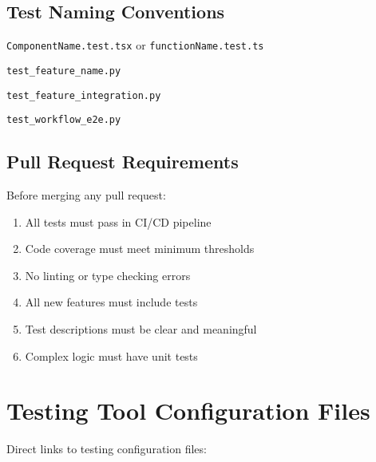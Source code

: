 \documentclass[12pt,a4paper]{article}
\begin{document}
\subsection{Test Naming Conventions}

\begin{description}[style=nextline]
    \item[Frontend] \texttt{ComponentName.test.tsx} or \texttt{functionName.test.ts}
    \item[Backend] \texttt{test\_feature\_name.py}
    \item[Integration] \texttt{test\_feature\_integration.py}
    \item[E2E] \texttt{test\_workflow\_e2e.py}
\end{description}

\subsection{Pull Request Requirements}

Before merging any pull request:
\begin{enumerate}
    \item All tests must pass in CI/CD pipeline
    \item Code coverage must meet minimum thresholds
    \item No linting or type checking errors
    \item All new features must include tests
    \item Test descriptions must be clear and meaningful
    \item Complex logic must have unit tests
\end{enumerate}

\section{Testing Tool Configuration Files}

Direct links to testing configuration files:
\end{document}
